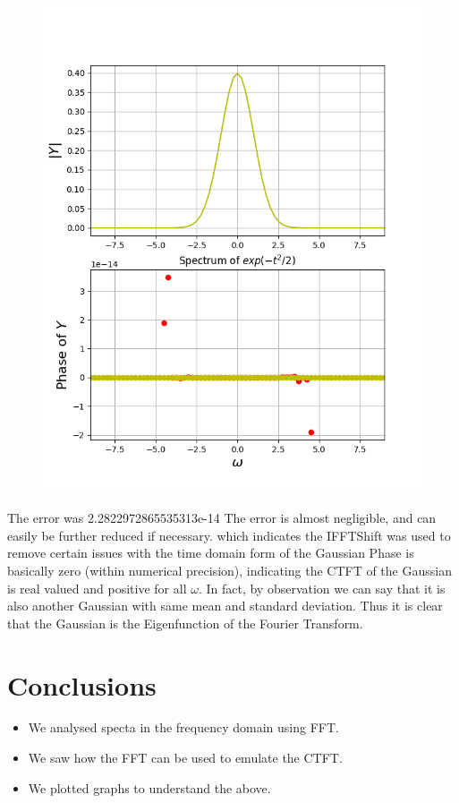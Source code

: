 \documentclass[11pt, a4paper]{article}
\begin{document}
\begin{figure}[!tbh]
   	\centering
   	\includegraphics[scale=0.5]{img8.png}
   	\label{fig:32}
   \end{figure}
{
The error was
2.2822972865535313e-14
The error is almost negligible, and can easily be further reduced if necessary.
which  indicates the
IFFTShift was used to remove certain issues with the time domain form of the Gaussian
Phase is basically zero (within numerical precision), indicating the CTFT of the Gaussian is real valued and positive for all $\omega$. In fact, by observation we can say that it is also another Gaussian with same mean and standard deviation.
Thus it is clear that the Gaussian is the Eigenfunction of the Fourier Transform. 
}




\section{Conclusions}
\begin{itemize}
\item We analysed specta in the frequency domain using FFT.
\item We saw how the FFT can be used to emulate the CTFT.
\item We plotted graphs to understand the above.
\end{itemize}
\end{document}
